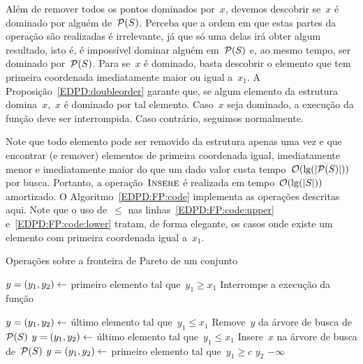 Além de remover todos os pontos dominados por~$x$, devemos descobrir se~$x$ é dominado por alguém de~$\mathcal{P}(S)$. Perceba que a ordem em que estas partes da operação são realizadas é irrelevante, já que só uma delas irá obter algum resultado, isto é, é impossível dominar alguém em~$\mathcal{P}(S)$ e, ao mesmo tempo, ser dominado por~$\mathcal{P}(S)$. Para se~$x$ é dominado, basta descobrir o elemento que tem primeira coordenada imediatamente maior ou igual a~$x_1$. A Proposição~\ref{EDPD:doubleorder} garante que, se algum elemento da estrutura domina~$x$,~$x$ é dominado por tal elemento. Caso~$x$ seja dominado, a execução da função deve ser interrompida. Caso contrário, seguimos normalmente.

Note que todo elemento pode ser removido da estrutura apenas uma vez e que encontrar (e remover) elementos de primeira coordenada igual, imediatamente menor e imediatamente maior do que um dado valor custa tempo~$\mathcal{O}(\lg(|\mathcal{P}(S)|))$ por busca. Portanto, a operação~$\textsc{Insere}$ é realizada em tempo~$\mathcal{O}(\lg(|S|))$ amortizado. O Algoritmo~\ref{EDPD:FP:code} implementa as operações descritas aqui. Note que o uso de~$\leq$ nas linhas~\ref{EDPD:FP:code:upper} e~\ref{EDPD:FP:code:lower} tratam, de forma elegante, os casos onde existe um elemento com primeira coordenada igual a~$x_1$.

\begin{algorithm}[h]
\caption{Operações sobre a fronteira de Pareto de um conjunto}
\label{EDPD:FP:code}
\begin{algorithmic}[1]
    \State $y = (y_1,y_2) \leftarrow$ primeiro elemento tal que~$y_1 \geq x_1$ \label{EDPD:FP:code:upper}
        \State Interrompe a execução da função
    \EndIf

    \State $y = (y_1,y_2) \leftarrow$ último elemento tal que~$y_1 \leq x_1$ \label{EDPD:FP:code:lower}
        \State Remove~$y$ da árvore de busca de~$\mathcal{P}(S)$
        \State $y = (y_1,y_2) \leftarrow$ último elemento tal que~$y_1 \leq x_1$
    \EndWhile
    \State Insere~$x$ na árvore de busca de~$\mathcal{P}(S)$
\EndFunction
{}
    \State $y = (y_1,y_2) \leftarrow$ primeiro elemento tal que~$y_1 \geq c$
        \State \Return $y_2$
    \Else
        \State \Return $-\infty$
    \EndIf
\EndFunction
\end{algorithmic}
\end{algorithm}

